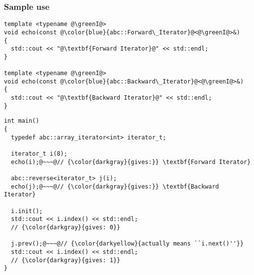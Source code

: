 \begin{frame}[fragile]
  \frametitle{Sample use}

\begin{multicols}{2}
%
\begin{lstlisting}[escapechar=@,basicstyle={\tiny\sffamily}]
template <typename @\greenI@>
void echo(const @\color{blue}{abc::Forward\_Iterator}@<@\greenI@>&)
{
  std::cout << "@\textbf{Forward Iterator}@" << std::endl;
}

template <typename @\greenI@>
void echo(const @\color{blue}{abc::Backward\_Iterator}@<@\greenI@>&)
{
  std::cout << "@\textbf{Backward Iterator}@" << std::endl;
}
\end{lstlisting}
%
\columnbreak
%
\begin{lstlisting}[escapechar=@,basicstyle={\tiny\sffamily}]
int main()
{
  typedef abc::array_iterator<int> iterator_t;
  
  iterator_t i(8);
  echo(i);@~~~@// {\color{darkgray}{gives:}} \textbf{Forward Iterator}

  abc::reverse<iterator_t> j(i);
  echo(j);@~~~@// {\color{darkgray}{gives:}} \textbf{Backward Iterator}
  
  i.init();
  std::cout << i.index() << std::endl;
  // {\color{darkgray}{gives: 0}}
  
  j.prev();@~~~@// {\color{darkyellow}{actually means ``i.next()''}}
  std::cout << i.index() << std::endl;
  // {\color{darkgray}{gives: 1}}
}
\end{lstlisting}
%
\end{multicols}

\end{frame}




